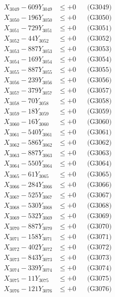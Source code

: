 \documentclass[a4paper,10pt]{article}
\begin{document}
{\begin{align}
X_{3049} - 609Y_{3049} &\leq +0 && \text{(G3049)} \\
X_{3050} - 196Y_{3050} &\leq +0 && \text{(G3050)} \\
\allowbreak
X_{3051} - 729Y_{3051} &\leq +0 && \text{(G3051)} \\
X_{3052} - 44Y_{3052} &\leq +0 && \text{(G3052)} \\
X_{3053} - 887Y_{3053} &\leq +0 && \text{(G3053)} \\
X_{3054} - 169Y_{3054} &\leq +0 && \text{(G3054)} \\
X_{3055} - 887Y_{3055} &\leq +0 && \text{(G3055)} \\
X_{3056} - 239Y_{3056} &\leq +0 && \text{(G3056)} \\
X_{3057} - 379Y_{3057} &\leq +0 && \text{(G3057)} \\
X_{3058} - 70Y_{3058} &\leq +0 && \text{(G3058)} \\
X_{3059} - 18Y_{3059} &\leq +0 && \text{(G3059)} \\
X_{3060} - 16Y_{3060} &\leq +0 && \text{(G3060)} \\
\allowbreak
X_{3061} - 540Y_{3061} &\leq +0 && \text{(G3061)} \\
X_{3062} - 586Y_{3062} &\leq +0 && \text{(G3062)} \\
X_{3063} - 887Y_{3063} &\leq +0 && \text{(G3063)} \\
X_{3064} - 550Y_{3064} &\leq +0 && \text{(G3064)} \\
X_{3065} - 61Y_{3065} &\leq +0 && \text{(G3065)} \\
X_{3066} - 284Y_{3066} &\leq +0 && \text{(G3066)} \\
X_{3067} - 525Y_{3067} &\leq +0 && \text{(G3067)} \\
X_{3068} - 530Y_{3068} &\leq +0 && \text{(G3068)} \\
X_{3069} - 532Y_{3069} &\leq +0 && \text{(G3069)} \\
X_{3070} - 887Y_{3070} &\leq +0 && \text{(G3070)} \\
\allowbreak
X_{3071} - 158Y_{3071} &\leq +0 && \text{(G3071)} \\
X_{3072} - 402Y_{3072} &\leq +0 && \text{(G3072)} \\
X_{3073} - 843Y_{3073} &\leq +0 && \text{(G3073)} \\
X_{3074} - 339Y_{3074} &\leq +0 && \text{(G3074)} \\
X_{3075} - 11Y_{3075} &\leq +0 && \text{(G3075)} \\
X_{3076} - 121Y_{3076} &\leq +0 && \text{(G3076)} \\

\end{align}}
\end{document}
